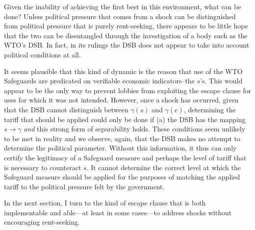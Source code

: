 \documentclass[12pt]{article}
\newcommand{\ga}{\gamma}
\begin{document}
Given the inability of achieving the first best in this environment, what can be done? Unless political pressure that comes from a shock can be distinguished from political pressure that is purely rent-seeking, there appears to be little hope that the two can be disentangled through the investigation of a body such as the WTO's DSB. In fact, in its rulings the DSB does not appear to take into account political conditions at all.

It seems plausible that this kind of dynamic is the reason that use of the WTO Safeguards are predicated on verifiable economic indicators--the $s$'s. This would appear to be the only way to prevent lobbies from exploiting the escape clause for uses for which it was not intended. However, once a shock has occurred, given that the DSB cannot distinguish between $\ga(s)$ and $\ga(e)$, determining the tariff that should be applied could only be done if (a) the DSB has the mapping $s \rightarrow \ga$ \textit{and} this strong form of separability holds. These conditions seem unlikely to be met in reality and we observe, again, that the DSB makes no attempt to determine the political parameter. Without this information, it thus can only certify the legitimacy of a Safeguard measure and perhaps the level of tariff that is necessary to counteract $s$. It cannot determine the correct level at which the Safeguard measure should be applied for the purposes of matching the applied tariff to the political pressure felt by the government.

In the next section, I turn to the kind of escape clause that is both implementable and able---at least in some cases---to address shocks without encouraging rent-seeking.
\end{document}

